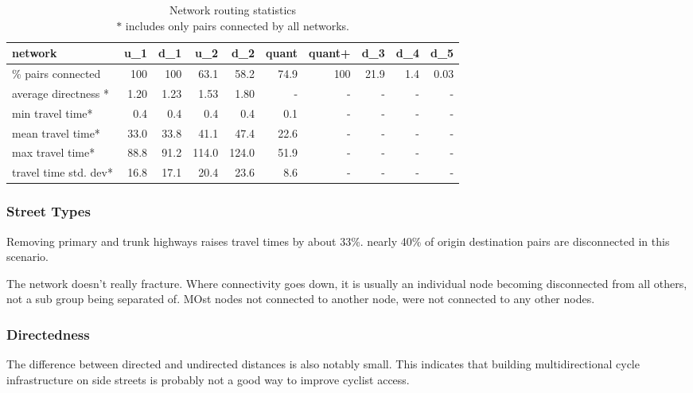 \begin{table}[]
\begin{tabular}{lrrrrrrrrr}
\toprule
network                  & u\_1    & d\_1    & u\_2  & d\_2  & quant & quant+ & d\_3 & d\_4 & d\_5 \\ \midrule
\% pairs connected       & 100     & 100     &  63.1 & 58.2  & 74.9  & 100    & 21.9 & 1.4  & 0.03 \\
average directness *     & 1.20    & 1.23    & 1.53  & 1.80  & -     & -      & -    & -    & -    \\
min travel time*         & 0.4     & 0.4     & 0.4   & 0.4   & 0.1   & -      & -    & -    & -    \\
mean travel time*        & 33.0    & 33.8    & 41.1  & 47.4  & 22.6  & -      & -    & -    & -    \\
max travel time*         & 88.8    & 91.2    & 114.0 & 124.0 & 51.9  & -      & -    & -    & -    \\
travel time std. dev*    & 16.8    & 17.1    & 20.4  & 23.6  & 8.6   & -      & -    & -    & -   \\ \bottomrule
\end{tabular}
\caption{Network routing statistics \\ $*$ includes only pairs connected by all networks.}
\label{table:travel_time_stats}
\end{table}

\subsubsection{Street Types}

Removing primary and trunk highways raises travel times by about 33\%. nearly 40\% of origin destination pairs are disconnected in this scenario. 

The network doesn't really fracture. Where connectivity goes down, it is usually an individual node becoming disconnected from all others, not a sub group being separated of. MOst nodes not connected to another node, were not connected to any other nodes. 

\subsubsection{Directedness}

The difference between directed and undirected distances is also notably small. This indicates that building multidirectional cycle infrastructure on side streets is probably not a good way to improve cyclist access.  


